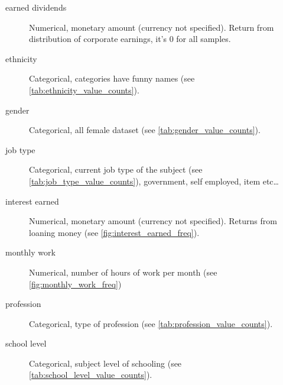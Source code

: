 \begin{description}
\item [earned dividends] Numerical, monetary amount (currency not specified).
    Return from distribution of corporate earnings, it's 0 for all samples.

\item [ethnicity] Categorical, categories have funny names
    (see \vref{tab:ethnicity_value_counts}).

\item [gender] Categorical, all female dataset
    (see \vref{tab:gender_value_counts}).

\item [job type] Categorical, current job type of the subject
    (see \vref{tab:job_type_value_counts}), government, self employed,
    item etc\ldots

\item [interest earned] Numerical, monetary amount (currency not specified).
    Returns from loaning money (see \vref{fig:interest_earned_freq}).

\item [monthly work] Numerical, number of hours of work per month
    (see \vref{fig:monthly_work_freq})

\item [profession] Categorical, type of profession
    (see \vref{tab:profession_value_counts}).

\item [school level] Categorical, subject level of schooling
    (see \vref{tab:school_level_value_counts}).

\end{description}

